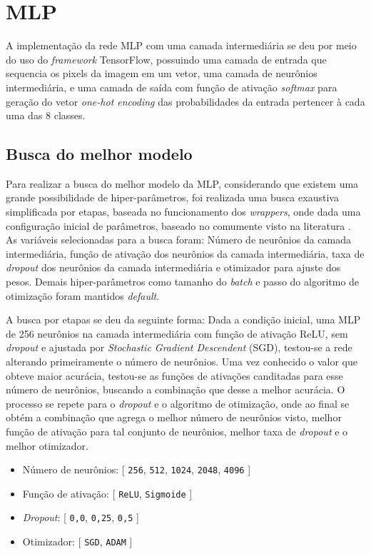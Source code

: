 \section{MLP}

A implementação da rede MLP com uma camada intermediária se deu por meio do uso do \textit{framework} TensorFlow, possuindo uma camada de entrada que sequencia os pixels da imagem em um vetor, uma camada de neurônios intermediária, e uma camada de saída com função de ativação \textit{softmax} para geração do vetor \textit{one-hot encoding} das probabilidades da entrada pertencer à cada uma das 8 classes.

\subsection{Busca do melhor modelo}

Para realizar a busca do melhor modelo da MLP, considerando que existem uma grande possibilidade de hiper-parâmetros, foi realizada uma busca exaustiva simplificada por etapas, baseada no funcionamento dos \textit{wrappers}, onde dada uma configuração inicial de parâmetros, baseado no comumente visto na literatura \cite{geron2019hands}. As variáveis selecionadas para a busca foram: Número de neurônios da camada intermediária, função de ativação dos neurônios da camada intermediária, taxa de \textit{dropout} dos neurônios da camada intermediária e otimizador para ajuste dos pesos. Demais hiper-parâmetros como tamanho do \textit{batch} e passo do algoritmo de otimização foram mantidos \textit{default}.

A busca por etapas se deu da seguinte forma: Dada a condição inicial, uma MLP de 256 neurônios na camada intermediária com função de ativação ReLU, sem \textit{dropout} e ajustada por \textit{Stochastic Gradient Descendent} (SGD), testou-se a rede alterando primeiramente o número de neurônios. Uma vez conhecido o valor que obteve maior acurácia, testou-se as funções de ativações canditadas para esse número de neurônios, buscando a combinação que desse a melhor acurácia. O processo se repete para o \textit{dropout} e o algoritmo de otimização, onde ao final se obtém a combinação que agrega o melhor número de neurônios visto, melhor função de ativação para tal conjunto de neurônios, melhor taxa de \textit{dropout} e o melhor otimizador.


\begin{itemize}
	\item Número de neurônios: [ \texttt{256}, \texttt{512}, \texttt{1024}, \texttt{2048}, \texttt{4096} ]
	\item Função de ativação: [ \texttt{ReLU}, \texttt{Sigmoide} ]
	\item \textit{Dropout}: [ \texttt{0,0}, \texttt{0,25}, \texttt{0,5} ]
	\item Otimizador: [ \texttt{SGD}, \texttt{ADAM} ]
\end{itemize} 

